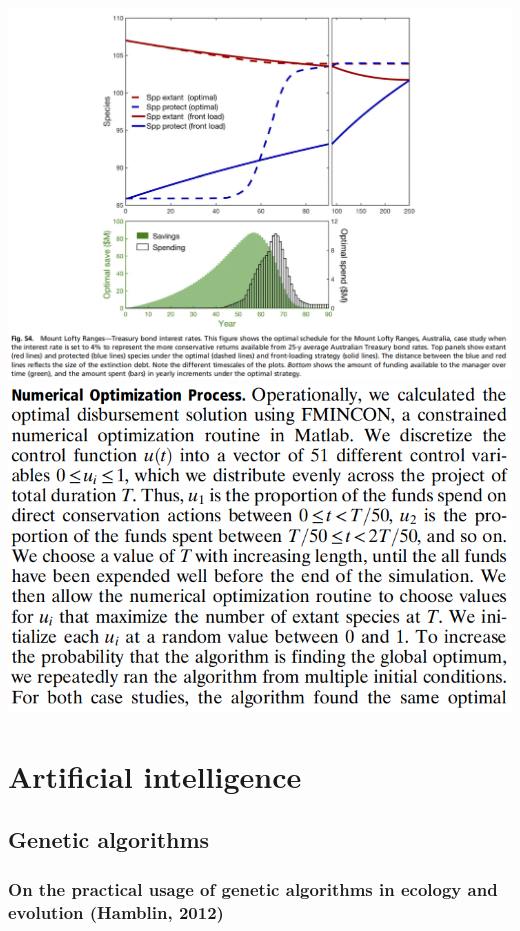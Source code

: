\documentclass[12pt]{article}
\begin{document}
\begin{center}
	\includegraphics[scale=0.35]{resultsMLR.png}
	\includegraphics[scale=0.5]{optimisationprocess.png}
\end{center}

\section{Artificial intelligence}

\subsection{Genetic algorithms}

\subsubsection{On the practical usage of genetic algorithms in ecology and evolution (Hamblin, 2012)}
\end{document}
